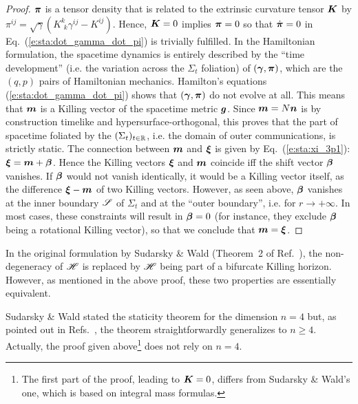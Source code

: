 \begin{proof}
$\bm{\pi}$ is a tensor density
that is related to the extrinsic curvature tensor $\bm{K}$ by
$\pi^{ij} = \sqrt{\gamma} (K^k_{\ \, k} \gamma^{ij} - K^{ij})$.
Hence, $\bm{K} = 0$ implies $\bm{\pi} = 0$ so that $\dot{\bm{\pi}} = 0$ in
Eq.~(\ref{e:sta:dot_gamma_dot_pi}) is trivially fulfilled. In the Hamiltonian formulation,
the spacetime dynamics is entirely described by the ``time development'' (i.e. the variation
across the $\Sigma_t$ foliation) of
$(\bm{\gamma}, \bm{\pi})$, which are the $(q,p)$ pairs of Hamiltonian mechanics. Hamilton's equations (\ref{e:sta:dot_gamma_dot_pi}) shows that $(\bm{\gamma}, \bm{\pi})$ do not evolve at all.
This means that $\bm{m}$ is a Killing vector of the spacetime metric
$\bm{g}$. Since $\bm{m} = N \bm{n}$ is by construction timelike and hypersurface-orthogonal,
this proves that the part of spacetime foliated by the $(\Sigma_t)_{t\in\mathbb{R}}$,
i.e. the domain of outer communications, is strictly static. The connection
between $\bm{m}$ and $\bm{\xi}$ is given by
Eq.~(\ref{e:sta:xi_3p1}): $\bm{\xi} = \bm{m} + \bm{\beta}$. Hence the Killing vectors
$\bm{\xi}$ and $\bm{m}$ coincide iff the shift vector $\bm{\beta}$ vanishes.
If $\bm{\beta}$ would not vanish identically, it would be a Killing vector itself,
as the difference $\bm{\xi} - \bm{m}$ of two Killing vectors.
However, as seen above,
$\bm{\beta}$ vanishes at the inner boundary $\mathscr{S}$ of $\Sigma_t$
and at the ``outer boundary'', i.e. for $r\to +\infty$.
In most cases, these constraints will result in $\bm{\beta} = 0$ (for instance, they
exclude $\bm{\beta}$ being a rotational Killing vector), so that we conclude
that $\bm{m} = \bm{\xi}$.
\end{proof}


\begin{remark}
In the original formulation by Sudarsky \& Wald (Theorem~2 of Ref.~\cite{SudarW93}), the non-degeneracy of $\mathscr{H}$
is replaced by $\mathscr{H}$ being part of a bifurcate Killing horizon.
However, as mentioned in the above proof, these two properties are essentially equivalent.
\end{remark}

\begin{remark}
Sudarsky \& Wald stated the staticity theorem for the dimension $n=4$ but, as pointed out in
Refs.~\cite{Chrus05,ChrusLH12,HollaI12}, the theorem straightforwardly generalizes
to $n \geq 4$. Actually, the proof given above\footnote{The first part of the proof,
leading to $\bm{K} = 0$, differs from Sudarsky \& Wald's one, which is based on integral
mass formulas.}
does not rely on $n=4$.
\end{remark}

